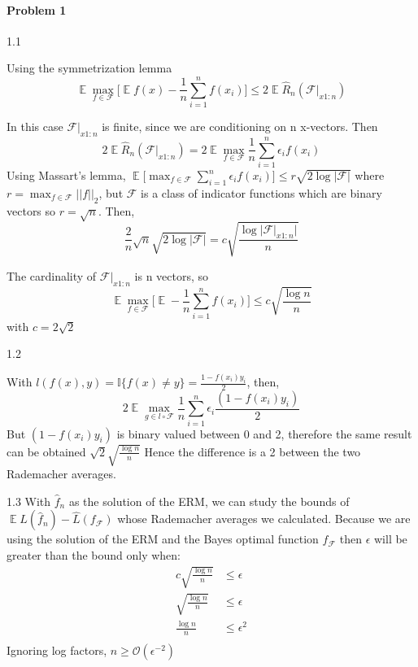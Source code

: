 \documentclass[12pt]{report}
\begin{document}
\maketitle

\paragraph{Problem 1}

1.1

Using the symmetrization lemma
$$ \mathop{\mathbb{E}} \max_{f \in \mathcal{F}} \big[ \mathop{\mathbb{E}}f(x) - \frac{1}{n} \sum^{n}_{i=1} f(x_{i}) \big] \leq 2 \mathop{\mathbb{E}} \hat{R}_{n}(\mathcal{F} \rvert_{x1:n}) $$

In this case $\mathcal{F} \lvert_{x1:n}$ is finite, since we are conditioning on n x-vectors. Then
$$ 2 \mathop{\mathbb{E}}\hat{R}_{n}(\mathcal{F} \rvert_{x1:n}) = 2 \mathop{\mathbb{E}} \max_{f \in \mathcal{F}} \frac{1}{n} \sum^{n}_{i=1} \epsilon_{i}f(x_{i}) $$
Using Massart's lemma, $\mathop{\mathbb{E}} \big[ \max_{f \in \mathcal{F}} \sum^{n}_{i=1}\epsilon_{i}f(x_{i})\big] \leq r \sqrt{2\log \lvert \mathcal{F} \rvert}$
where $r = \max_{f \in \mathcal{F}} \lvert \lvert f \rvert \rvert_{2}$, but $\mathcal{F}$ is a class of indicator functions which are binary vectors so $r = \sqrt{n}$. Then,
$$ \frac{2}{n} \sqrt{n} \sqrt{2 \log \lvert \mathcal{F} \rvert} = c \sqrt{\frac{\log \lvert \mathcal{F}\rvert_{x1:n} \rvert}{n}} $$

The cardinality of $\mathcal{F}\rvert_{x1:n}$ is n vectors, so
$$ \mathop{\mathbb{E}} \max_{f \in \mathcal{F}} \big[ \mathop{\mathbb{E}} - \frac{1}{n}\sum^{n}_{i=1}f(x_{i}) \big] \leq c \sqrt{\frac{\log n}{n}} $$
with $c = 2\sqrt{2} $

1.2

With $l(f(x), y) = \mathbb{I}\{f(x) \neq y\} = \frac{1 - f(x_{i})y_{i}}{2}$, then,
$$2 \mathop{\mathbb{E}} \max_{g \in l \circ \mathcal{F}} \frac{1}{n} \sum^{n}_{i=1}\epsilon_{i}\frac{(1 - f(x_{i})y_{i})}{2} $$
But $(1 - f(x_{i})y_{i})$ is binary valued between 0 and 2, therefore the same result can be obtained $\sqrt{2} \sqrt{\frac{\log n}{n}}$
Hence the difference is a 2 between the two Rademacher averages.

1.3
With $\hat{f}_{n}$ as the solution of the ERM, we can study the bounds of $\mathop{\mathbb{E}}L(\hat{f}_{n}) - \hat{L}(f_{\mathcal{F}})$ whose Rademacher averages we calculated. Because we are using the solution
of the ERM and the Bayes optimal function $f_{\mathcal{F}}$ then $\epsilon$ will be greater than the bound only when:
\begin{equation}
  \begin{aligned}
    c \sqrt{\frac{\log n}{n}} & \leq \epsilon \\
    \sqrt{\frac{\log n}{n}} & \leq \epsilon \\ 
    \frac{\log n}{n} & \leq \epsilon^{2} \\
  \end{aligned}
\end{equation}
Ignoring log factors, $n \geq \mathcal{O}(\epsilon^{-2})$
\end{document}
